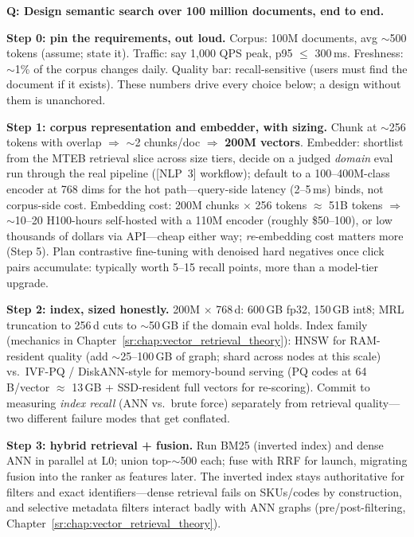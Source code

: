 \begin{interviewq}
\textbf{Q: Design semantic search over 100 million documents, end to end.}

 \quad {} \quad \badgefreq{\freqhigh}

\stronganswer

\textbf{Step 0: pin the requirements, out loud.} Corpus: 100M documents, avg $\sim$500 tokens (assume; state it). Traffic: say 1{,}000 QPS peak, p95 $\leq$ 300\,ms. Freshness: $\sim$1\% of the corpus changes daily. Quality bar: recall-sensitive (users must find the document if it exists). These numbers drive every choice below; a design without them is unanchored.

\textbf{Step 1: corpus representation and embedder, with sizing.} Chunk at $\sim$256 tokens with overlap $\Rightarrow$ $\sim$2 chunks/doc $\Rightarrow$ \textbf{200M vectors}. Embedder: shortlist from the MTEB retrieval slice across size tiers, decide on a judged \textit{domain} eval run through the real pipeline ([NLP~3] workflow); default to a 100--400M-class encoder at 768 dims for the hot path---query-side latency (2--5\,ms) binds, not corpus-side cost. Embedding cost: 200M chunks $\times$ 256 tokens $\approx$ 51B tokens $\Rightarrow$ $\sim$10--20 H100-hours self-hosted with a 110M encoder (roughly \$50--100), or low thousands of dollars via API---cheap either way; \textit{re}-embedding cost matters more (Step 5). Plan contrastive fine-tuning with denoised hard negatives once click pairs accumulate: typically worth 5--15 recall points, more than a model-tier upgrade.

\textbf{Step 2: index, sized honestly.} 200M $\times$ 768\,d: 600\,GB fp32, 150\,GB int8; MRL truncation to 256\,d cuts to $\sim$50\,GB if the domain eval holds. Index family (mechanics in Chapter~\ref{sr:chap:vector_retrieval_theory}): HNSW for RAM-resident quality (add $\sim$25--100\,GB of graph; shard across nodes at this scale) vs.\ IVF-PQ / DiskANN-style for memory-bound serving (PQ codes at 64\,B/vector $\approx$ 13\,GB + SSD-resident full vectors for re-scoring). Commit to measuring \textit{index recall} (ANN vs.\ brute force) separately from retrieval quality---two different failure modes that get conflated.

\textbf{Step 3: hybrid retrieval + fusion.} Run BM25 (inverted index) and dense ANN in parallel at L0; union top-$\sim$500 each; fuse with RRF for launch, migrating fusion into the ranker as features later. The inverted index stays authoritative for filters and exact identifiers---dense retrieval fails on SKUs/codes by construction, and selective metadata filters interact badly with ANN graphs (pre/post-filtering, Chapter~\ref{sr:chap:vector_retrieval_theory}).


\end{interviewq}
